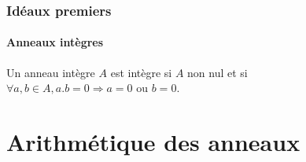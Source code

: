 \documentclass[reqno,a4paper,10pt]{report}
\newcommand{\soo}{\Longrightarrow}
\begin{document}
\subsection{Idéaux premiers}
\subsubsection{Anneaux intègres}
Un anneau intègre $A$ est intègre si $A$ non nul et si\\
$\forall a,b \in A, a.b = 0 \soo a=0$ ou $b=0$.

\chapter{Arithmétique des anneaux}
\end{document}
